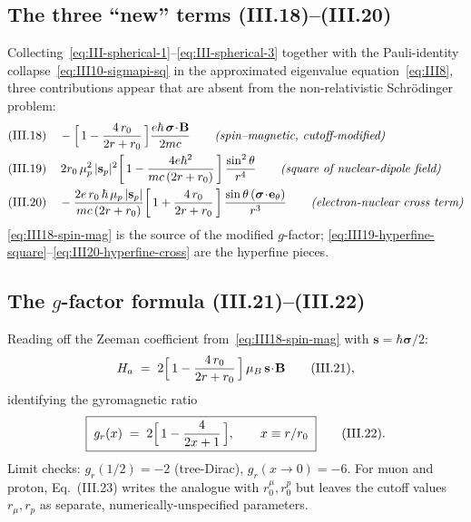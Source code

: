 \subsection{The three ``new'' terms (III.18)--(III.20)}

Collecting~\eqref{eq:III-spherical-1}--\eqref{eq:III-spherical-3} together
with the Pauli-identity collapse~\eqref{eq:III10-sigmapi-sq} in the
approximated eigenvalue equation~\eqref{eq:III8}, three contributions
appear that are absent from the non-relativistic Schr\"odinger problem:
\begin{align}
\label{eq:III18-spin-mag}
\text{(III.18)}\quad
&-\Bigl[\,1 - \frac{4\,r_0}{2 r + r_0}\,\Bigr]
   \frac{e\hbar\,\boldsymbol\sigma\!\cdot\!\mathbf{B}}{2 m c}
   \qquad\textit{(spin--magnetic, cutoff-modified)} \\
\label{eq:III19-hyperfine-square}
\text{(III.19)}\quad
&\,2 r_0\,\mu_p^2\,|\mathbf{s}_p|^2\!
  \left[\,1 - \frac{4 e \hbar^2}{m c\,(2 r + r_0)}\,\right]
  \frac{\sin^2\theta}{r^4}
   \qquad\textit{(square of nuclear-dipole field)} \\
\label{eq:III20-hyperfine-cross}
\text{(III.20)}\quad
&-\frac{2 e\,r_0\,\hbar\,\mu_p\,|\mathbf{s}_p|}
       {m c\,(2 r + r_0)}\!
   \left[\,1 + \frac{4\,r_0}{2 r + r_0}\,\right]
   \frac{\sin\theta\,(\boldsymbol\sigma\!\cdot\!\mathbf{e}_\theta)}{r^3}
   \qquad\textit{(electron-nuclear cross term)}
\end{align}
\eqref{eq:III18-spin-mag} is the source of the modified $g$-factor;
\eqref{eq:III19-hyperfine-square}--\eqref{eq:III20-hyperfine-cross} are the
hyperfine pieces.

\subsection{The $g$-factor formula (III.21)--(III.22)}

Reading off the Zeeman coefficient from~\eqref{eq:III18-spin-mag} with
$\mathbf{s} = \hbar\boldsymbol\sigma/2$:
\begin{equation}
\label{eq:III21-anomalous-Ham}
H_a \;=\; 2\Bigl[\,1 - \frac{4\,r_0}{2 r + r_0}\,\Bigr]\,
         \mu_B\,\mathbf{s}\!\cdot\!\mathbf{B}\qquad\text{(III.21)},
\end{equation}
identifying the gyromagnetic ratio
\begin{equation}
\label{eq:III22-gr}
\boxed{\;g_r(x) \;=\; 2\Bigl[\,1 - \frac{4}{2 x + 1}\,\Bigr],
\qquad x \equiv r / r_0\;}\qquad\text{(III.22)}.
\end{equation}
Limit checks: $g_r(1/2) = -2$ (tree-Dirac), $g_r(x\to 0) = -6$.
For muon and proton, Eq.~(III.23) writes the analogue with
$r_0^\mu, r_0^p$ but leaves the cutoff values
$r_\mu, r_p$ as separate, numerically-unspecified parameters.

